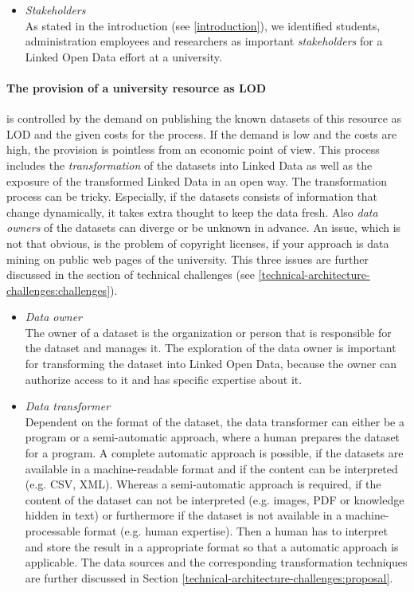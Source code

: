 \documentclass{article}
\begin{document}
\begin{itemize}
\item \textit{Stakeholders}~\\
As stated in the introduction (see \ref{introduction}), we identified students, administration employees and researchers as important \textit{stakeholders} for a Linked Open Data effort at a university.

\end{itemize}

\paragraph{The provision of a university resource as LOD}
\label{technical-architecture-challenges:lod-effort:provision-resources}
is controlled by the demand on publishing the known datasets of this resource as LOD and the given costs for the process. If the demand is low and the costs are high, the provision is pointless from an economic point of view. This process includes the \textit{transformation} of the datasets into Linked Data as well as the exposure of the transformed Linked Data in an open way. The transformation process can be tricky. Especially, if the datasets consists of information that change dynamically, it takes extra thought to keep the data fresh. Also \textit{data owners} of the datasets can diverge or be unknown in advance. An issue, which is not that obvious, is the problem of copyright licenses, if your approach is data mining on public web pages of the university. This three issues are further discussed in the section of technical challenges (see \ref{technical-architecture-challenges:challenges}).

\begin{itemize}
\item \textit{Data owner}~\\
The owner of a dataset is the organization or person that is responsible for the dataset and manages it. The exploration of the data owner is important for transforming the dataset into Linked Open Data, because the owner can authorize access to it and has specific expertise about it. 

\item \textit{Data transformer}~\\
Dependent on the format of the dataset, the data transformer can either be a program or a semi-automatic approach, where a human prepares the dataset for a program. A complete automatic approach is possible, if the datasets are available in a machine-readable format and if the content can be interpreted (e.g. CSV, XML). Whereas a semi-automatic approach is required, if the content of the dataset can not be interpreted (e.g. images, PDF or knowledge hidden in text) or furthermore if the dataset is not available in a machine-processable format (e.g. human expertise). Then a human has to interpret and store the result in a appropriate format so that a automatic approach is applicable. The data sources and the corresponding transformation techniques are further discussed in Section \ref{technical-architecture-challenges:proposal}.

\end{itemize}
\end{document}
